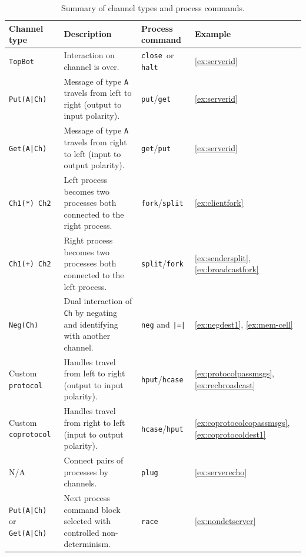\documentclass[acmsmall]{acmart}
\begin{document}
\begin{table}[!ht]
\centering
	\caption{Summary of channel types and process commands.}
	\label{Table:summary}
	\begin{tabular}{ | p{2.8cm} | p{6cm} | p{2cm} | p{1.3cm} | }
	\hline
		 {\bf Channel type} & {\bf Description} & {\bf Process \newline command} & {\bf Example} \\
		 \hline      
		 \lstinline$TopBot$ & Interaction on channel is over.  & \lstinline$close $or \lstinline$halt$ & \ref{ex:serverid} \\
		 \hline      
		 \lstinline$Put(A|Ch)$ & Message of type \lstinline$A$ travels from left to right (output to input polarity).  & \lstinline$put$/\lstinline$get$ & \ref{ex:serverid} \\
		 \hline      
		 \lstinline$Get(A|Ch)$ & Message of type \lstinline$A$ travels from right to left (input to output polarity). & \lstinline$get$/\lstinline$put$ & \ref{ex:serverid} \\
		 \hline      
		 \lstinline$Ch1(*) Ch2$ & Left process becomes two processes both connected to the right process.  & \lstinline$fork$/\lstinline$split$ & \ref{ex:clientfork} \\
		 \hline
		 \lstinline$Ch1(+) Ch2$ & Right process becomes two processes both connected to the left process.  & \lstinline$split$/\lstinline$fork$ & \ref{ex:sendersplit}, \ref{ex:broadcastfork} \\
		 \hline      
		 \lstinline$Neg(Ch)$ & Dual interaction of \lstinline$Ch$ by negating and \newline identifying with another channel.  & \lstinline$neg$ and \lstinline$|=|$  &  \ref{ex:negdest1}, \ref{ex:mem-cell} \\
		 \hline
		 Custom \lstinline$protocol$ & Handles travel from left to right \newline (output to input polarity). & \lstinline$hput$/\lstinline$hcase$ & \ref{ex:protocolpassmsgs}, \ref{ex:recbroadcast} \\
		 \hline
		 Custom \lstinline$coprotocol$ & Handles travel from right to left \newline (input to output polarity). & \lstinline$hcase$/\lstinline$hput$ & \ref{ex:coprotocolcopassmsgs}, \ref{ex:coprotocoldest1} \\
		 \hline
		  N/A & Connect pairs of processes by channels.  & \lstinline$plug$ & \ref{ex:serverecho} \\
		 \hline
		  \lstinline$Put(A|Ch)$ or \newline \lstinline$Get(A|Ch)$ & Next process command block selected with controlled non-determinism.  & \lstinline$race$ & \ref{ex:nondetserver} \\

\end{tabular}
\end{table}
\end{document}
